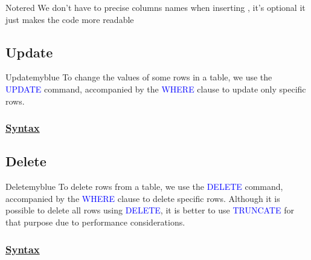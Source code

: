 \begin{prettyBox}{Note}{red}
We don't have to precise columns names when inserting , it's optional it just makes the code more readable
\end{prettyBox}

\subsection{Update}
\begin{prettyBox}{Update}{myblue}
To change the values of some rows in a table, we use the \textcolor{blue}{UPDATE} command, accompanied by the \textcolor{blue}{WHERE} clause to update only specific rows.
\end{prettyBox}

\subsubsection*{\underline{\textbf{Syntax}}}


\subsection{Delete} 

\begin{prettyBox}{Delete}{myblue}
To delete rows from a table, we use the \textcolor{blue}{DELETE} command, accompanied by the \textcolor{blue}{WHERE} clause to delete specific rows. Although it is possible to delete all rows using \textcolor{blue}{DELETE}, it is better to use \textcolor{blue}{TRUNCATE} for that purpose due to performance considerations.
\end{prettyBox}

\subsubsection*{\underline{\textbf{Syntax}}}


